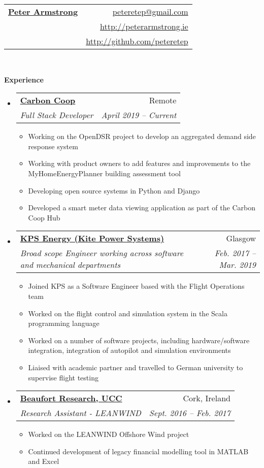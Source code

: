 \documentclass[letterpaper,11pt]{article}
\makeatletter
\newcommand{\resitem}[1]{\item #1 \vspace{-2pt}}
\newcommand{\resheading}[1]{{\large \colorbox{mygrey}{\begin{minipage}{\textwidth}{\textbf{#1 \vphantom{p\^{E}}}}\end{minipage}}}}
\newcommand{\ressubheading}[4]{
\begin{tabular*}{6.5in}{l@{\extracolsep{\fill}}r}
		\textbf{#1} & #2 \\
		\textit{#3} & \textit{#4} \\
\end{tabular*}\vspace{-6pt}}
\makeatother
\begin{document}
\newcommand{\mywebheader}{
\begin{tabular*}{7in}{l@{\extracolsep{\fill}}r}
	\textbf{\href{http://peterarmstrong.ie/}{\LARGE Peter Armstrong}} & \href{mailto:peteretep@gmail.com}{peteretep@gmail.com}\\
	& \href{http://peterarmstrong.ie}{http://peterarmstrong.ie} \\
	& \href{http://github.com/peteretep}{http://github.com/peteretep}
	\end{tabular*}
\\
\vspace{0.1in}}

\mywebheader

\resheading{Experience}
  

	\begin{itemize}
	 \item 
      \ressubheading{\href{http://carbon.coop}{Carbon Coop}}{Remote}
        {Full Stack Developer }{April 2019 -- Current}
        {
        \begin{itemize}
          \resitem{Working on the OpenDSR project to develop an aggregated demand side response system}
          \resitem{Working with product owners to add features and improvements to the MyHomeEnergyPlanner building assessment tool}
          \resitem{Developing open source systems in Python and Django}
          \resitem{Developed a smart meter data viewing application as part of the Carbon Coop Hub}
        \end{itemize}
        }
    \item 
      \ressubheading{\href{http://www.kps.energy}{KPS Energy (Kite Power Systems)}}{Glasgow}
        {Broad scope Engineer working across software and mechanical departments }{Feb. 2017 -- Mar. 2019}
        {
        \begin{itemize}
          \resitem{Joined KPS as a Software Engineer based with the Flight Operations team }
          \resitem{Worked on the flight control and simulation system in the Scala programming language}
          \resitem{Worked on a number of software projects, including hardware/software integration, integration of autopilot and simulation environments}

          \resitem{Liaised with academic partner and travelled to German university to supervise flight testing}
			
        \end{itemize}
        }
        \item 
      \ressubheading{\href{http://www.ucc.ie}{Beaufort Research, UCC}}{Cork, Ireland}
        {Research Assistant - LEANWIND}{Sept. 2016 -- Feb. 2017  }
        {
        \begin{itemize}
          \resitem{Worked on the LEANWIND Offshore Wind project}
          \resitem{Continued development of legacy financial modelling tool in MATLAB and Excel}
        \end{itemize}
        }


\end{itemize}
\end{document}
